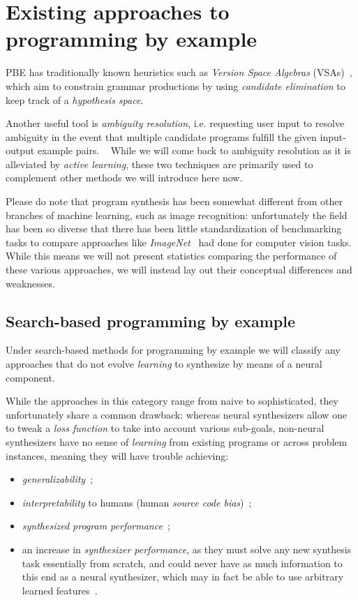 \documentclass{article}
\begin{document}

\section{Existing approaches to programming by example}

PBE has traditionally known heuristics such as
\emph{Version Space Algebras} (VSAs)~\citep{mitchell1982generalization},
which aim to constrain grammar productions by using
\emph{candidate elimination} to keep track of a \emph{hypothesis space}.

Another useful tool is \emph{ambiguity resolution},
i.e. requesting user input to resolve ambiguity
in the event that multiple candidate programs
fulfill the given input-output example pairs.%
~\citep{gulwani2017program}
While we will come back to ambiguity resolution as it is
alleviated by \emph{active learning},
these two techniques are primarily used to complement
other methods we will introduce here now.

Please do note that program synthesis has been somewhat different
from other branches of machine learning, such as image recognition:
unfortunately the field has been so diverse that there has been little
standardization of benchmarking tasks to compare approaches like
\emph{ImageNet}~\citep{deng2009imagenet} had done for computer vision tasks.
While this means we will not present statistics
comparing the performance of these various approaches,
we will instead lay out their conceptual differences and weaknesses.

\subsection{Search-based programming by example}

Under search-based methods for programming by example we will classify any approaches that do not evolve \emph{learning} to synthesize by means of a neural component.

While the approaches in this category range from naive to sophisticated,
they unfortunately share a common drawback:
whereas neural synthesizers allow one to tweak a \emph{loss function} to take into account various sub-goals,
non-neural synthesizers have no sense of \emph{learning}
from existing programs or across problem instances,
meaning they will have trouble achieving:
\begin{itemize}
    \item \emph{generalizability}~\citep{nps};
    \item \emph{interpretability} to humans (human \emph{source code bias})~\citep{nps};
    \item \emph{synthesized program performance}~\citep{schkufza2016stochastic};
    \item an increase in \emph{synthesizer performance},
    as they must solve any new synthesis task essentially from scratch,
    and could never have as much information to this end as a neural synthesizer,
    which may in fact be able to use arbitrary learned features~\citep{odena2020learning}.
\end{itemize}
\end{document}
